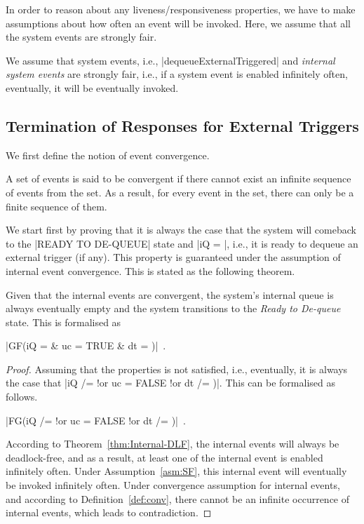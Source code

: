 In order to reason about any liveness/responsiveness properties, we
have to make assumptions about how often an event will be invoked.
Here, we assume that all the system events are strongly fair.
\begin{assumption}
  \label{asm:SF}
  We assume that system events, i.e., |dequeueExternalTriggered|
  and \emph{internal system events} are strongly fair, i.e., if a system
  event is enabled infinitely often, eventually, it will be eventually
  invoked.
\end{assumption}


\subsection{Termination of Responses for External Triggers}
\label{sec:contr-rema-resp}

We first define the notion of event convergence.
\begin{definition}
  \label{def:conv}
  A set of events is said to be convergent if there cannot exist an
  infinite sequence of events from the set.  As a result, for every
  event in the set, there can only be a finite sequence of them.
\end{definition}

We start first by proving that it is always the case that the system
will comeback to the |READY TO DE-QUEUE| state and |iQ = {}|,
i.e., it is ready to dequeue an external trigger (if any).  This
property is guaranteed under the assumption of internal event
convergence.  This is stated as the following theorem.
\begin{theorem}
  \label{thm:finite-internal-events}
  Given that the internal events are convergent, the system's 
  internal queue is always eventually empty and the system transitions to the
  \emph{Ready to De-queue} state.  This is formalised as
  \begin{center}
    |GF(iQ = {} & uc = TRUE & dt = {})|~.
  \end{center}
\end{theorem}
\begin{proof}
  Assuming that the properties is not satisfied, i.e., eventually,
  it is always the case that %
  |iQ /= {} !or  uc = FALSE !or dt /=  {})|.  %
  This can be formalised as follows.
  \begin{center}
    |FG(iQ /= {} !or uc = FALSE !or dt /= {})|~.    
  \end{center}
  According to Theorem~\ref{thm:Internal-DLF}, the internal events
  will always be deadlock-free, and as a result, at least one
  of the internal event is enabled infinitely often. Under
  Assumption~\ref{asm:SF}, this internal event will eventually be
  invoked infinitely often.  Under convergence assumption for internal
  events, and according to Definition~\ref{def:conv}, there cannot be
  an infinite occurrence of internal events, which leads to
  contradiction.
\end{proof}

